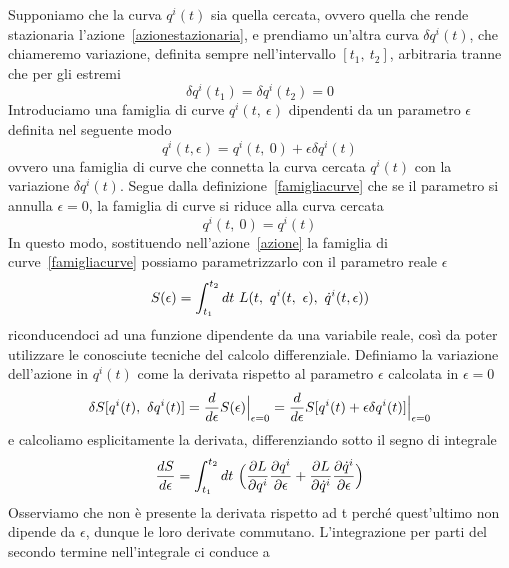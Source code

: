     Supponiamo che la curva $q^i(t)$ sia quella cercata, ovvero quella che rende stazionaria l'azione~\eqref{azionestazionaria}, e prendiamo un'altra curva $\delta q^i(t)$, che chiameremo variazione, definita sempre nell'intervallo $[t_1, ~t_2]$, arbitraria tranne che per gli estremi
    \begin{equation} \label{estreminulli}
        \delta q^i(t_1) = \delta q^i(t_2) = 0
    \end{equation}
    Introduciamo una famiglia di curve $q^i(t, ~\epsilon)$ dipendenti da un parametro $\epsilon$ definita nel seguente modo 
    \begin{equation} \label{famigliacurve}
        q^i(t, \epsilon) = q^i(t, ~0) + \epsilon \delta q^i(t)
    \end{equation}
    ovvero una famiglia di curve che connetta la curva cercata $q^i(t)$ con la variazione $\delta q^i(t)$. Segue dalla definizione~\eqref{famigliacurve} che se il parametro si annulla $\epsilon=0$, la famiglia di curve si riduce alla curva cercata
    \begin{equation*}
        q^i(t, ~ 0) = q^i(t)
    \end{equation*}
    In questo modo, sostituendo nell'azione~\eqref{azione} la famiglia di curve~\eqref{famigliacurve} possiamo parametrizzarlo con il parametro reale $\epsilon$
    \begin{equation*}
        S(\epsilon) = \int_{t_1}^{t_2}dt~ L(t, ~q^i(t, ~\epsilon), ~\dot q^i(t, \epsilon))
    \end{equation*}
    riconducendoci ad una funzione dipendente da una variabile reale, così da poter utilizzare le conosciute tecniche del calcolo differenziale. Definiamo la variazione dell'azione in $q^i(t)$ come la derivata rispetto al parametro $\epsilon$ calcolata in $\epsilon = 0$
    \begin{equation} \label{variazioneazione}
        \delta S[q^i(t), ~ \delta q^i(t)] = \frac{d}{d\epsilon} S(\epsilon) \Big \vert_{\epsilon = 0} = \frac{d}{d\epsilon} S[q^i(t) + \epsilon \delta q^i(t)] \Big \vert_{\epsilon = 0}
    \end{equation}
    e calcoliamo esplicitamente la derivata, differenziando sotto il segno di integrale
    \begin{equation*}
        \frac{dS}{d\epsilon} = \int_{t_1}^{t_2}dt~ \Big (\frac{\partial L}{\partial q^i} \frac{\partial q^i}{\partial\epsilon} + \frac{\partial L}{\partial\dot q^i} \frac{\partial\dot q^i}{\partial\epsilon} \Big)
    \end{equation*}\label{prova1}
    Osserviamo che non è presente la derivata rispetto ad t perché quest'ultimo non dipende da $\epsilon$, dunque le loro derivate commutano. L'integrazione per parti del secondo termine nell'integrale ci conduce a

